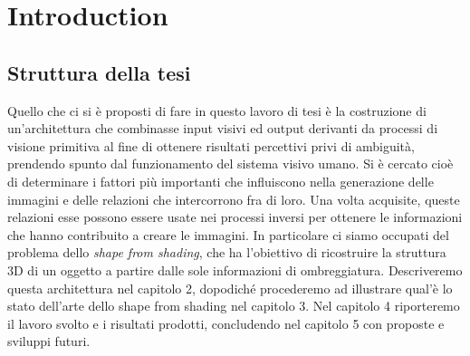 \chapter{Introduction}

\cite{challet2013minority}

\section{Struttura della tesi}
Quello che ci si è proposti di fare in questo lavoro di tesi è la costruzione di un'architettura che combinasse input visivi ed output derivanti da processi di visione primitiva al fine di ottenere risultati percettivi privi di ambiguità, prendendo spunto dal funzionamento del sistema visivo umano.
Si è cercato cioè di determinare i fattori più importanti che influiscono nella generazione delle immagini e delle relazioni che intercorrono fra di loro. Una volta acquisite, queste relazioni esse possono essere usate nei processi inversi per ottenere le informazioni che hanno contribuito a creare le immagini.
In particolare ci siamo occupati del problema dello \textit{shape from shading}, che ha l'obiettivo di ricostruire la struttura 3D di un oggetto a partire dalle sole informazioni di ombreggiatura.
Descriveremo questa architettura nel capitolo 2, dopodiché procederemo ad illustrare qual'è lo stato dell'arte dello shape from shading nel capitolo 3. 
Nel capitolo 4 riporteremo il lavoro svolto e i risultati prodotti, concludendo nel capitolo 5 con proposte e sviluppi futuri.